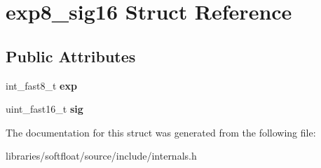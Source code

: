 \hypertarget{structexp8__sig16}{}\section{exp8\+\_\+sig16 Struct Reference}
\label{structexp8__sig16}
\subsection*{Public Attributes}
\begin{DoxyCompactItemize}
\item 
\mbox{\label{structexp8__sig16_abd72e2de3e109e3a944b47edd4b7b74d}} 
int\+\_\+fast8\+\_\+t {\bfseries exp}
\item 
\mbox{\label{structexp8__sig16_ae3b5c2043a54096a10111aad9e8352e1}} 
uint\+\_\+fast16\+\_\+t {\bfseries sig}
\end{DoxyCompactItemize}


The documentation for this struct was generated from the following file\+:\begin{DoxyCompactItemize}
\item 
libraries/softfloat/source/include/internals.\+h\end{DoxyCompactItemize}
